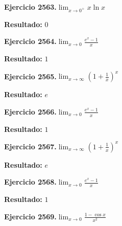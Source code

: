 \documentclass[10pt,a4paper]{article}
\begin{document}
\begin{ejbox}
\textbf{Ejercicio 2563.}\quad $\lim_{x\to 0^+} x\ln x$
\end{ejbox}

\begin{solbox}
\textbf{Resultado:} \(\displaystyle 0\)
\end{solbox}

\begin{ejbox}
\textbf{Ejercicio 2564.}\quad $\lim_{x\to 0} \frac{e^x-1}{x}$
\end{ejbox}

\begin{solbox}
\textbf{Resultado:} \(\displaystyle 1\)
\end{solbox}

\newpage
\begin{ejbox}
\textbf{Ejercicio 2565.}\quad $\lim_{x\to \infty} \left(1+\frac{1}{x}\right)^x$
\end{ejbox}

\begin{solbox}
\textbf{Resultado:} \(\displaystyle e\)
\end{solbox}

\begin{ejbox}
\textbf{Ejercicio 2566.}\quad $\lim_{x\to 0} \frac{e^x-1}{x}$
\end{ejbox}

\begin{solbox}
\textbf{Resultado:} \(\displaystyle 1\)
\end{solbox}

\begin{ejbox}
\textbf{Ejercicio 2567.}\quad $\lim_{x\to \infty} \left(1+\frac{1}{x}\right)^x$
\end{ejbox}

\begin{solbox}
\textbf{Resultado:} \(\displaystyle e\)
\end{solbox}

\newpage
\begin{ejbox}
\textbf{Ejercicio 2568.}\quad $\lim_{x\to 0} \frac{e^x-1}{x}$
\end{ejbox}

\begin{solbox}
\textbf{Resultado:} \(\displaystyle 1\)
\end{solbox}

\begin{ejbox}
\textbf{Ejercicio 2569.}\quad $\lim_{x\to 0} \frac{1-\cos x}{x^2}$
\end{ejbox}
\end{document}
